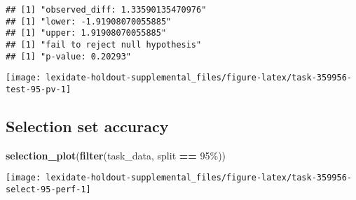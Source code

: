 \documentclass[
]{book}
\newenvironment{Shaded}{\begin{snugshade}}{\end{snugshade}}
\newcommand{\AttributeTok}[1]{\textcolor[rgb]{0.13,0.29,0.53}{#1}}
\newcommand{\DecValTok}[1]{\textcolor[rgb]{0.00,0.00,0.81}{#1}}
\newcommand{\FunctionTok}[1]{\textcolor[rgb]{0.13,0.29,0.53}{\textbf{#1}}}
\newcommand{\NormalTok}[1]{#1}
\newcommand{\OtherTok}[1]{\textcolor[rgb]{0.56,0.35,0.01}{#1}}
\newcommand{\SpecialCharTok}[1]{\textcolor[rgb]{0.81,0.36,0.00}{\textbf{#1}}}
\newcommand{\StringTok}[1]{\textcolor[rgb]{0.31,0.60,0.02}{#1}}
\begin{document}
\begin{Shaded}
\end{Shaded}

\begin{verbatim}
## [1] "observed_diff: 1.33590135470976"
## [1] "lower: -1.91908070055885"
## [1] "upper: 1.91908070055885"
## [1] "fail to reject null hypothesis"
## [1] "p-value: 0.20293"
\end{verbatim}

\texttt{[image: lexidate-holdout-supplemental\_files/figure-latex/task-359956-test-95-pv-1]}

\hypertarget{selection-set-accuracy-29}{%
\subsection{Selection set accuracy}\label{selection-set-accuracy-29}}

\begin{Shaded}
\begin{Highlighting}[]
\FunctionTok{selection\_plot}\NormalTok{(}\FunctionTok{filter}\NormalTok{(task\_data, split }\SpecialCharTok{==} \StringTok{\textquotesingle{}95\%\textquotesingle{}}\NormalTok{))}
\end{Highlighting}
\end{Shaded}

\texttt{[image: lexidate-holdout-supplemental\_files/figure-latex/task-359956-select-95-perf-1]}
\end{document}
